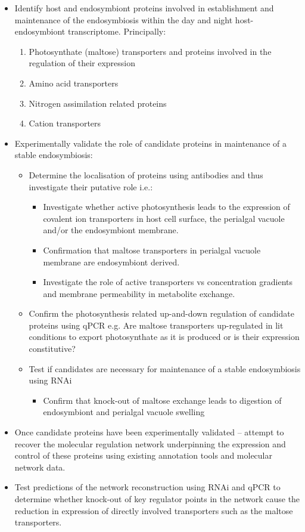 \begin{itemize}
  \item Identify host and endosymbiont proteins involved in establishment and maintenance of the endosymbiosis within the day and night host-endosymbiont transcriptome.  Principally:
  \begin{enumerate}
    \item Photosynthate (maltose) transporters and proteins involved in the regulation of their expression
    \item Amino acid transporters
    \item Nitrogen assimilation related proteins
    \item Cation transporters
  \end{enumerate}
  \item Experimentally validate the role of candidate proteins in maintenance of a stable endosymbiosis:
  \begin{itemize}
    \item Determine the localisation of proteins using antibodies and thus investigate their putative role  i.e.:
    \begin{itemize}
      \item Investigate whether active photosynthesis leads to the expression of covalent ion transporters in host cell surface, the perialgal vacuole and/or the endosymbiont membrane.
      \item Confirmation that maltose transporters in perialgal vacuole membrane are endosymbiont derived.
      \item Investigate the role of active transporters vs concentration gradients and membrane permeability in metabolite exchange.
    \end{itemize}
    \item Confirm the photosynthesis related up-and-down regulation of candidate proteins using qPCR e.g. Are maltose transporters up-regulated in lit conditions to export photosynthate as it is produced or is their expression constitutive?
    \item Test if candidates are necessary for maintenance of a stable endosymbiosis using RNAi
    \begin{itemize}
      \item Confirm that knock-out of maltose exchange leads to digestion of endosymbiont and perialgal vacuole swelling
    \end{itemize}
  \end{itemize}
  \item Once candidate proteins have been experimentally validated – attempt to recover the molecular regulation network underpinning the expression and control of these proteins using existing annotation tools and molecular network data.
  \item Test predictions of the network reconstruction using RNAi and qPCR to determine whether knock-out of key regulator points in the network cause the reduction in expression of directly involved transporters such as the maltose transporters.
\end{itemize}



